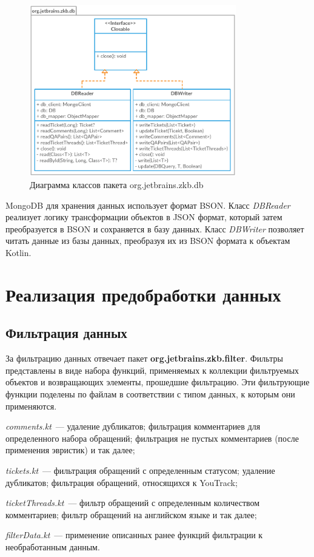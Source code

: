 \begin{figure}[tph!]
\centerline{\includegraphics[width=9cm]{fig/dbmodel.png}}
    \caption{Диаграмма классов пакета org.jetbrains.zkb.db}
    \label{fig:dbdmodel}
\end{figure}


MongoDB для хранения данных использует формат BSON. Класс \textit{DBReader} реализует логику трансформации объектов в JSON формат, который затем преобразуется в BSON и сохраняется в базу данных. Класс \textit{DBWriter} позволяет читать данные из базы данных, преобразуя их из BSON формата к объектам Kotlin.

\section{Реализация предобработки данных}
\subsection{Фильтрация данных}
За фильтрацию данных отвечает пакет \textbf{org.jetbrains.zkb.filter}. Фильтры представлены в виде набора функций, применяемых к коллекции фильтруемых объектов и возвращающих элементы, прошедшие фильтрацию. Эти фильтрующие функции поделены по файлам в соответствии с типом данных, к которым они применяются.

\begin{itemize*}
\item \textit{comments.kt}~--- удаление дубликатов; фильтрация комментариев для определенного набора обращений; фильтрация не пустых комментариев (после применения эвристик) и так далее;
\item \textit{tickets.kt}~--- фильтрация обращений с определенным статусом; удаление дубликатов; фильтрация обращений, относящихся к YouTrack;
\item \textit{ticketThreads.kt}~--- фильтр обращений с определенным количеством комментариев; фильтр обращений на английском языке и так далее;
\item \textit{filterData.kt}~--- применение описанных ранее функций фильтрации к необработанным данным.
\end{itemize*}


